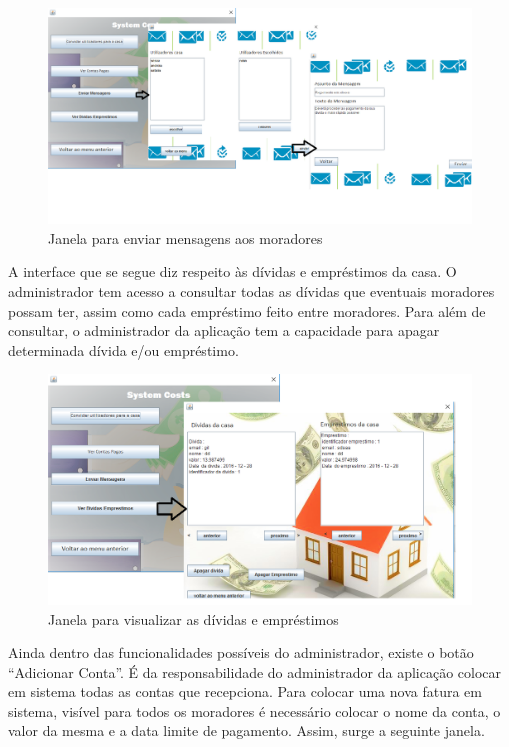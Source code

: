 \begin{figure}[h!]
	\centering
	\includegraphics[scale=0.45]{imagens/interface/enviarmensagemadmin}  
	\caption{Janela para enviar mensagens aos moradores}  
\end{figure}

A interface que se segue diz respeito às dívidas e empréstimos da casa. O administrador tem acesso a consultar todas as dívidas que eventuais moradores possam ter, assim como cada empréstimo feito entre moradores. Para além de consultar, o administrador da aplicação tem a capacidade para apagar determinada dívida e/ou empréstimo. 

\begin{figure}[h!]
	\centering
	\includegraphics[scale=0.45]{imagens/interface/verdividaseemprestimosadmin}  
	\caption{Janela para visualizar as dívidas e empréstimos}  
\end{figure}

\newpage

Ainda dentro das funcionalidades possíveis do administrador, existe o botão “Adicionar Conta”. É da responsabilidade do administrador da aplicação colocar em sistema todas as contas que recepciona. Para colocar uma nova fatura em sistema, visível para todos os moradores é necessário colocar o nome da conta, o valor da mesma e a data limite de pagamento. Assim, surge a seguinte janela.

